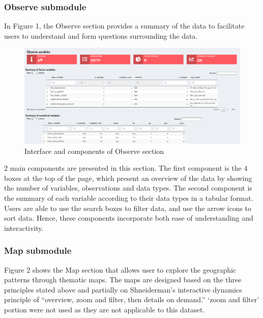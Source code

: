 \documentclass{acm_proc_article-sp}
\begin{document}
\vspace{-5truemm}

\hypertarget{observe-submodule}{%
\subsubsection{Observe submodule}\label{observe-submodule}}

In Figure 1, the Observe section provides a summary of the data to
facilitate users to understand and form questions surrounding the data.

\begin{figure}[H]

{\centering \includegraphics[width=1\linewidth]{images/design_observe} 

}

\caption{Interface and components of Observe section}\label{fig:unnamed-chunk-1}
\end{figure}

2 main components are presented in this section. The first component is
the 4 boxes at the top of the page, which present an overview of the
data by showing the number of variables, observations and data types.
The second component is the summary of each variable according to their
data types in a tabular format. Users are able to use the search boxes
to filter data, and use the arrow icons to sort data. Hence, these
components incorporate both ease of understanding and interactivity.

\hypertarget{map-submodule}{%
\subsubsection{Map submodule}\label{map-submodule}}

Figure 2 shows the Map section that allows user to explore the
geographic patterns through thematic maps. The maps are designed based
on the three principles stated above and partially on Shneiderman's
interactive dynamics principle of ``overview, zoom and filter, then
details on demand.'' `zoom and filter' portion were not used as they are
not applicable to this dataset.
\end{document}
